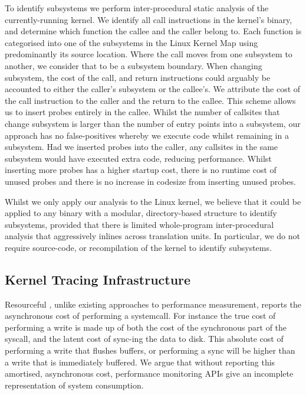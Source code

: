 \documentclass[letterpaper,twocolumn,10pt]{article}
\newcommand{\pname}{Resourceful}
\begin{document}
To identify subsystems we perform inter-procedural static analysis of the currently-running kernel.
We identify all call instructions in the kernel's binary, and determine which function the callee and the caller belong to.
Each function is categorised into one of the subsystems in the Linux Kernel Map using predominantly its source location.
Where the call moves from one subsystem to another, we consider that to be a subsystem boundary.
When changing subsystem, the cost of the call, and return instructions could arguably be accounted to either the caller's subsystem or the callee's.
We attribute the cost of the call instruction to the caller and the return to the callee.
This scheme allows us to insert probes entirely in the callee.
Whilst the number of callsites that change subsystem is larger than the number of entry points into a subsystem, our approach has no false-positives whereby we execute code whilst remaining in a subsystem.
Had we inserted probes into the caller, any callsites in the same subsystem would have executed extra code, reducing performance.
Whilst inserting more probes has a higher startup cost, there is no runtime cost of unused probes and there is no increase in codesize from inserting unused probes.


Whilst we only apply our analysis to the Linux kernel, we believe that it could be applied to any binary with a modular, directory-based structure to identify subsystems, provided that there is limited whole-program inter-procedural analysis that aggressively inlines across translation units.
In particular, we do not require source-code, or recompilation of the kernel to identify subsystems.



\subsection{Kernel Tracing Infrastructure}

\pname{ }, unlike existing approaches to performance measurement, reports the asynchronous cost of performing a systemcall.
For instance the true cost of performing a write is made up of both the cost of the synchronous part of the syscall, and the latent cost of sync-ing the data to disk.
This absolute cost of performing a write that flushes buffers, or performing a sync will be higher than a write that is immediately buffered.
We argue that without reporting this amortised, asynchronous cost, performance monitoring APIs give an incomplete representation of system consumption.
\end{document}
